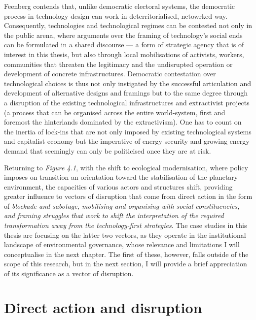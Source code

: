 \documentclass[a4paper, nobind]{templates/ociamthesis}
\begin{document}
Feenberg contends that, unlike democratic electoral systems, the democratic process in technology design can work in deterritorialised, netowrked way. Consequently, technologies and technological regimes can be contested not only in the public arena, where arguments over the framing of technology's social ends can be formulated in a shared discourse --- a form of strategic agency that is of interest in this thesis, but also through local mobilisations of activists, workers, communities that threaten the legitimacy and the undisrupted operation or development of concrete infrastructures. Democratic contestation over technological choices is thus not only instigated by the successful articulation and development of alternative designs and framings but to the same degree through a disruption of the existing technological infrastructures and extractivist projects (a process that can be organised across the entire world-system, first and foremost the hinterlands dominated by the extractivism). One has to count on the inertia of lock-ins that are not only imposed by existing technological systems and capitalist economy but the imperative of energy security and growing energy demand that seemingly can only be politicised once they are at risk.

Returning to \emph{Figure 4.1}, with the shift to ecological modernisation, where policy imposes on transition an orientation toward the stabilisation of the planetary environment, the capacities of various actors and structures shift, providing greater influence to vectors of disruption that come from direct action in the form of \emph{blockade and sabotage, mobilising and organising with social constituencies, and framing struggles that work to shift the interpretation of the required transformation away from the technology-first strategies}. The case studies in this thesis are focusing on the latter two vectors, as they operate in the institutional landscape of environmental governance, whose relevance and limitations I will conceptualise in the next chapter. The first of these, however, falls outside of the scope of this research, but in the next section, I will provide a brief appreciation of its significance as a vector of disruption.

\hypertarget{direct-action-and-disruption}{%
\section{Direct action and disruption}\label{direct-action-and-disruption}}
\end{document}
